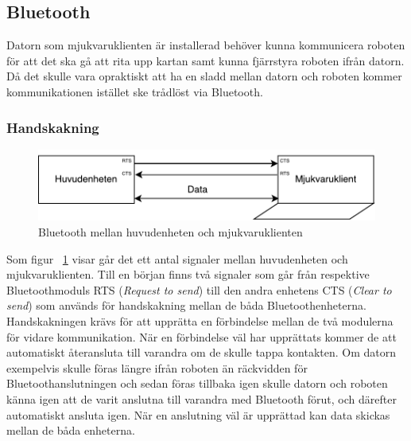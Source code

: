\documentclass{article}
\begin{document}

\subsection{Bluetooth}
Datorn som mjukvaruklienten är installerad behöver kunna kommunicera roboten för att det ska gå att rita upp kartan samt kunna fjärrstyra roboten ifrån datorn. Då det skulle vara opraktiskt att ha en sladd mellan datorn och roboten kommer kommunikationen istället ske trådlöst via Bluetooth. 

\subsubsection{Handskakning}
\begin{figure}[H]
\centering 
\includegraphics[scale=0.8]{Kommunikation_Bluetooth}
\caption{Bluetooth mellan huvudenheten och mjukvaruklienten}
\label{fig:Kommunikation_Bluetooth}
\end{figure}

Som figur ~\ref{fig:Kommunikation_Bluetooth} visar går det ett antal signaler mellan huvudenheten och mjukvaruklienten. Till en början finns två signaler som går från respektive Bluetoothmoduls RTS (\textit{Request to send}) till den andra enhetens CTS (\textit{Clear to send}) som används för handskakning mellan de båda Bluetoothenheterna. Handskakningen krävs för att upprätta en förbindelse mellan de två modulerna för vidare kommunikation. När en förbindelse väl har upprättats kommer de att automatiskt återansluta till varandra om de skulle tappa kontakten. Om datorn exempelvis skulle föras längre ifrån roboten än räckvidden för Bluetoothanslutningen och sedan föras tillbaka igen skulle datorn och roboten känna igen att de varit anslutna till varandra med Bluetooth förut, och därefter automatiskt ansluta igen.
\newline\newline
När en anslutning väl är upprättad kan data skickas mellan de båda enheterna.
\end{document}
